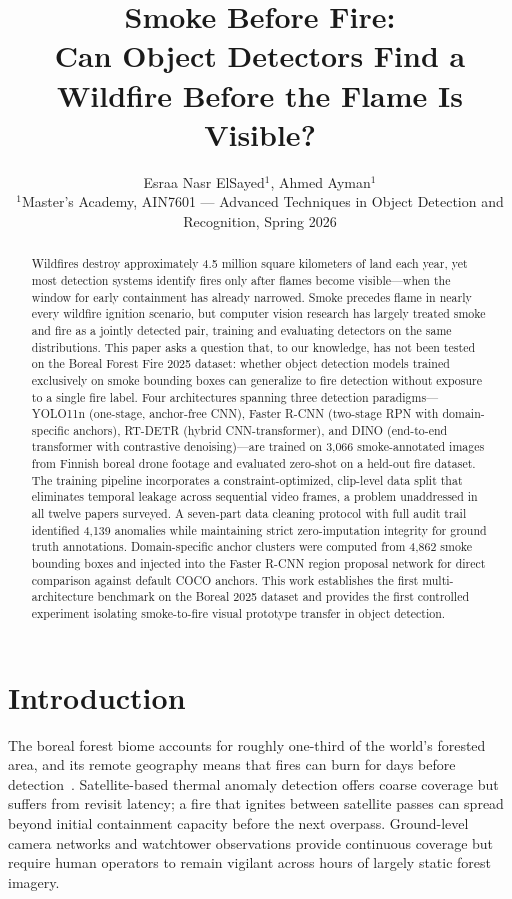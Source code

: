 \documentclass[10pt,twocolumn]{article}
\title{\vspace{-1.5cm}\textbf{Smoke Before Fire:\\Can Object Detectors Find a Wildfire Before the Flame Is Visible?}}
\author{
    Esraa Nasr ElSayed$^{1}$, Ahmed Ayman$^{1}$ \\
    \small $^{1}$Master's Academy, AIN7601 --- Advanced Techniques in Object Detection and Recognition, Spring 2026
}
\date{}
\begin{document}
\maketitle

\begin{abstract}
Wildfires destroy approximately 4.5 million square kilometers of land each year, yet most detection systems identify fires only after flames become visible---when the window for early containment has already narrowed. Smoke precedes flame in nearly every wildfire ignition scenario, but computer vision research has largely treated smoke and fire as a jointly detected pair, training and evaluating detectors on the same distributions. This paper asks a question that, to our knowledge, has not been tested on the Boreal Forest Fire 2025 dataset: whether object detection models trained exclusively on smoke bounding boxes can generalize to fire detection without exposure to a single fire label. Four architectures spanning three detection paradigms---YOLO11n (one-stage, anchor-free CNN), Faster R-CNN (two-stage RPN with domain-specific anchors), RT-DETR (hybrid CNN-transformer), and DINO (end-to-end transformer with contrastive denoising)---are trained on 3,066 smoke-annotated images from Finnish boreal drone footage and evaluated zero-shot on a held-out fire dataset. The training pipeline incorporates a constraint-optimized, clip-level data split that eliminates temporal leakage across sequential video frames, a problem unaddressed in all twelve papers surveyed. A seven-part data cleaning protocol with full audit trail identified 4,139 anomalies while maintaining strict zero-imputation integrity for ground truth annotations. Domain-specific anchor clusters were computed from 4,862 smoke bounding boxes and injected into the Faster R-CNN region proposal network for direct comparison against default COCO anchors. This work establishes the first multi-architecture benchmark on the Boreal 2025 dataset and provides the first controlled experiment isolating smoke-to-fire visual prototype transfer in object detection.
\end{abstract}

\section{Introduction}

The boreal forest biome accounts for roughly one-third of the world's forested area, and its remote geography means that fires can burn for days before detection~\cite{wwf2022wildfire}. Satellite-based thermal anomaly detection offers coarse coverage but suffers from revisit latency; a fire that ignites between satellite passes can spread beyond initial containment capacity before the next overpass. Ground-level camera networks and watchtower observations provide continuous coverage but require human operators to remain vigilant across hours of largely static forest imagery.
\end{document}
